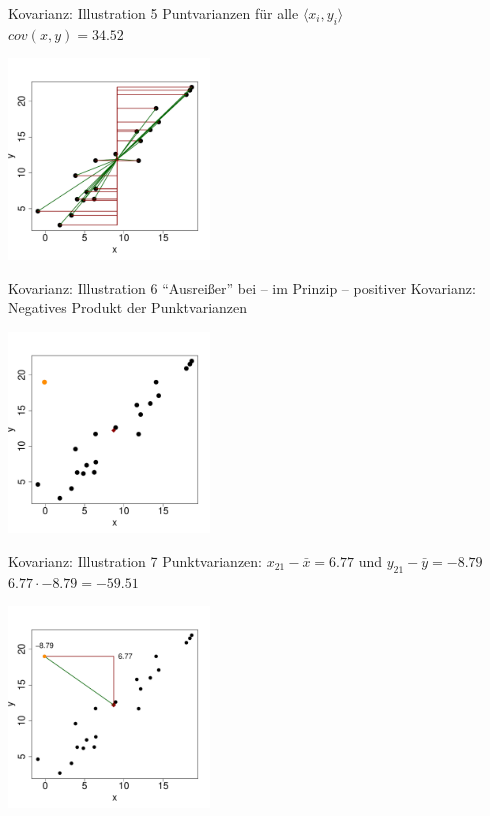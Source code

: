 \begin{frame}
  {Kovarianz: Illustration 5}
  Puntvarianzen für alle $\langle x_i,y_i\rangle$\\
  $cov(x,y)=34.52$
  \begin{center}
    \includegraphics[width=0.4\textwidth]{graphics/cov05}
  \end{center}
\end{frame}


\begin{frame}
  {Kovarianz: Illustration 6}
  "`Ausreißer"' bei -- im Prinzip -- positiver Kovarianz:\\
  \alert{Negatives Produkt} der Punktvarianzen
  \begin{center}
    \includegraphics[width=0.4\textwidth]{graphics/cov06}
  \end{center}
\end{frame}


\begin{frame}
  {Kovarianz: Illustration 7}
  Punktvarianzen: $x_{21}-\bar{x}=6.77$ und $y_{21}-\bar{y}=-8.79$\\
  \alert{$6.77\cdot-8.79=-59.51$}
  \begin{center}
    \includegraphics[width=0.4\textwidth]{graphics/cov07}
  \end{center}
\end{frame}

